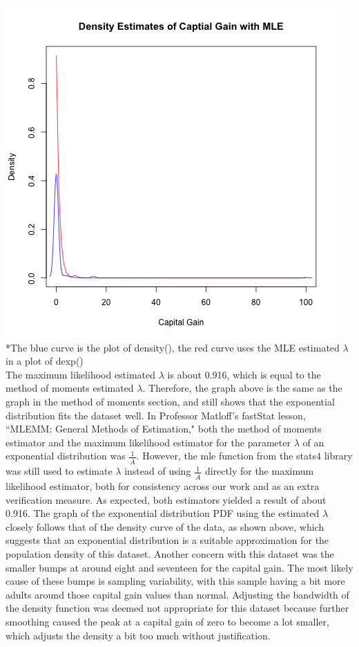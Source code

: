 \documentclass[12pt, letterpaper]{article}
\begin{document}
\includegraphics[scale=0.9]{capital_gain_mle}
\footnotesize
\\ \**The blue curve is the plot of density(), the red curve uses the MLE estimated $\lambda$ in a plot of dexp() \\
\normalsize
The maximum likelihood estimated $\lambda$ is about 0.916, which is equal to the method of moments estimated $\lambda$. Therefore, the graph above is the same as the graph in the method of moments section, and still shows that the exponential distribution fits the dataset well.
\newpage
\noindent
\normalsize
In Professor Matloff's fastStat lesson, ``MLEMM: General Methods of Estimation," both the method of moments estimator and the maximum likelihood estimator for the parameter $\lambda$ of an exponential distribution was $\frac{\ 1\ }{\overline{A}}$. However, the mle function from the stats4 library was still used to estimate $\lambda$ instead of using $\frac{\ 1\ }{\overline{A}}$ directly for the maximum likelihood estimator, both for consistency across our work and as an extra verification measure. As expected, both estimators yielded a result of about 0.916. The graph of the exponential distribution PDF using the estimated $\lambda$ closely follows that of the density curve of the data, as shown above, which suggests that an exponential distribution is a suitable approximation for the population density of this dataset. Another concern with this dataset was the smaller bumps at around eight and seventeen for the capital gain. The most likely cause of these bumps is sampling variability, with this sample having a bit more adults around those capital gain values than normal. Adjusting the bandwidth of the density function was deemed not appropriate for this dataset because further smoothing caused the peak at a capital gain of zero to become a lot smaller, which adjusts the density a bit too much without justification.
\end{document}
